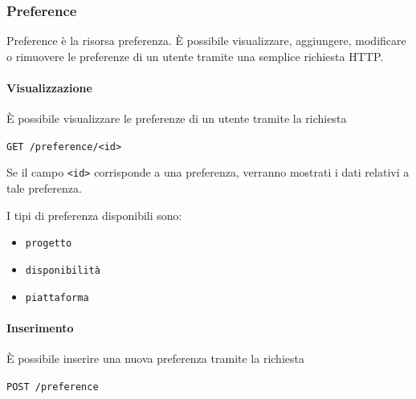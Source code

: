 \subsubsection{Preference}
Preference è la risorsa preferenza. È possibile visualizzare, aggiungere, modificare o rimuovere le preferenze di un utente tramite una semplice richiesta HTTP.

\paragraph{Visualizzazione}
È possibile visualizzare le preferenze di un utente tramite la richiesta
    \begin{center}
        \texttt{GET  /preference/<id>}
    \end{center}
Se il campo \texttt{<id>} corrisponde a una preferenza, verranno mostrati i dati relativi a tale preferenza.

I tipi di preferenza disponibili sono:
\begin{itemize}[noitemsep]
    \item \texttt{progetto}
    \item \texttt{disponibilità}
    \item \texttt{piattaforma}
\end{itemize}

\paragraph{Inserimento}
È possibile inserire una nuova preferenza tramite la richiesta
    \begin{center}
        \texttt{POST /preference}
    \end{center}

